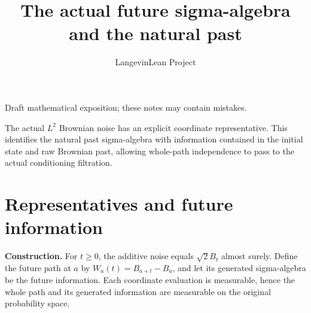 \documentclass[11pt,a4paper]{article}
\title{\texorpdfstring{The actual future sigma-algebra and the natural past}{The actual future sigma-algebra and the natural past}}
\author{LangevinLean Project}
\date{}
\begin{document}
\maketitle
Draft mathematical exposition; these notes may contain mistakes.


The actual \(L^2\) Brownian noise has an explicit coordinate representative. This identifies the natural past sigma-algebra with information contained in the initial state and raw Brownian past, allowing whole-path independence to pass to the actual conditioning filtration.


\section{\texorpdfstring{Representatives and future information}{Representatives and future information}}


\textbf{Construction.} For \(t\ge0\), the additive noise equals \(\sqrt2 B_t\) almost surely. Define the future path at \(a\) by \(W_a(t)=B_{a+t}-B_a\), and let its generated sigma-algebra be the future information. Each coordinate evaluation is measurable, hence the whole path and its generated information are measurable on the original probability space.
\end{document}
